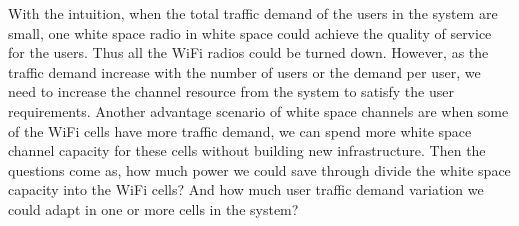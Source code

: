 With the intuition, when the total traffic demand of the users in the system are small, one white space radio in 
white space could achieve the quality of service for the users. Thus all the WiFi radios could be turned down. 
However, as the traffic demand increase with the number of users or the demand per user, we need to increase the 
channel resource from the system to satisfy the user requirements. 
Another advantage scenario of white space channels are when some of the WiFi cells have more traffic demand, we can spend more 
white space channel capacity for these cells without building new infrastructure. 
Then the questions come as, how much power we could save through divide the white space capacity into the WiFi cells? 
And how much user traffic demand variation we could adapt in one or more cells in the system?






